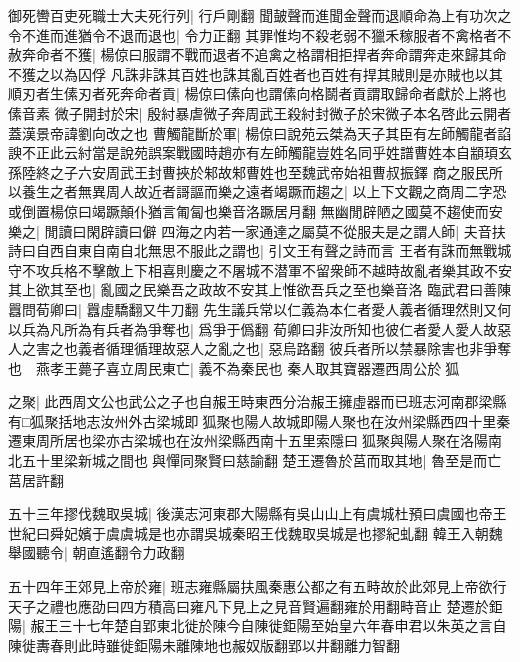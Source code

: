 御死轡百吏死職士大夫死行列|{
	行戶剛翻}
聞皷聲而進聞金聲而退順命為上有功次之令不進而進猶令不退而退也|{
	令力正翻}
其罪惟均不殺老弱不獵禾稼服者不禽格者不赦奔命者不獲|{
	楊倞曰服謂不戰而退者不追禽之格謂相拒捍者奔命謂奔走來歸其命不獲之以為囚俘}
凡誅非誅其百姓也誅其亂百姓者也百姓有捍其賊則是亦賊也以其順刃者生傃刃者死奔命者貢|{
	楊倞曰傃向也謂傃向格鬬者貢謂取歸命者獻於上將也傃音素}
微子開封於宋|{
	殷紂暴虐微子奔周武王殺紂封微子於宋微子本名啓此云開者蓋漢景帝諱劉向改之也}
曹觸龍斷於軍|{
	楊倞曰說苑云桀為天子其臣有左師觸龍者諂諛不正此云紂當是說苑誤案戰國時趙亦有左師觸龍豈姓名同乎姓譜曹姓本自顓頊玄孫陸終之子六安周武王封曹挾於邾故邾曹姓也至魏武帝始祖曹叔振鐸}
商之服民所以養生之者無異周人故近者謌謳而樂之遠者竭蹶而趨之|{
	以上下文觀之商周二字恐或倒置楊倞曰竭蹶顛仆猶言匍匐也樂音洛蹶居月翻}
無幽閒辟陋之國莫不趨使而安樂之|{
	閒讀曰閑辟讀曰僻}
四海之内若一家通達之屬莫不從服夫是之謂人師|{
	夫音扶}
詩曰自西自東自南自北無思不服此之謂也|{
	引文王有聲之詩而言}
王者有誅而無戰城守不攻兵格不擊敵上下相喜則慶之不屠城不潜軍不留衆師不越時故亂者樂其政不安其上欲其至也|{
	亂國之民樂吾之政故不安其上惟欲吾兵之至也樂音洛}
臨武君曰善陳囂問荀卿曰|{
	囂虛驕翻又牛刀翻}
先生議兵常以仁義為本仁者愛人義者循理然則又何以兵為凡所為有兵者為爭奪也|{
	爲爭于僞翻}
荀卿曰非汝所知也彼仁者愛人愛人故惡人之害之也義者循理循理故惡人之亂之也|{
	惡烏路翻}
彼兵者所以禁暴除害也非爭奪也　燕孝王薨子喜立周民東亡|{
	義不為秦民也}
秦人取其寶器遷西周公於狐

之聚|{
	此西周文公也武公之子也自赧王時東西分治赧王擁虛器而已班志河南郡梁縣有□狐聚括地志汝州外古梁城即狐聚也陽人故城即陽人聚也在汝州梁縣西四十里秦遷東周所居也梁亦古梁城也在汝州梁縣西南十五里索隱曰狐聚與陽人聚在洛陽南北五十里梁新城之間也與憚同聚賢曰慈諭翻}
楚王遷魯於莒而取其地|{
	魯至是而亡莒居許翻}


五十三年摎伐魏取吳城|{
	後漢志河東郡大陽縣有吳山山上有虞城杜預曰虞國也帝王世紀曰舜妃嬪于虞虞城是也亦謂吳城秦昭王伐魏取吳城是也摎紀虬翻}
韓王入朝魏舉國聽令|{
	朝直遙翻令力政翻}


五十四年王郊見上帝於雍|{
	班志雍縣屬扶風秦惠公都之有五畤故於此郊見上帝欲行天子之禮也應劭曰四方積高曰雍凡下見上之見音賢遍翻雍於用翻畤音止}
楚遷於鉅陽|{
	赧王三十七年楚自郢東北徙於陳今自陳徙鉅陽至始皇六年春申君以朱英之言自陳徙夀春則此時雖徙鉅陽未離陳地也赧奴版翻郢以井翻離力智翻}


